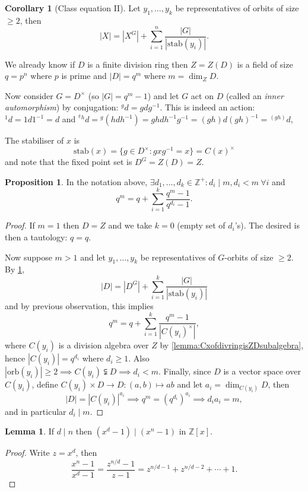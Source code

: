 \documentclass[a4paper]{article}
\newcommand{\Z}{\mathbb{Z}}
\newcommand{\orb}{\text{orb}}
\newcommand{\stab}{\text{stab}}
\theoremstyle{definition}
\newtheorem{prop}[defn]{Proposition}
\newtheorem{lemma}[defn]{Lemma}
\newtheorem{coro}[defn]{Corollary}
\begin{document}
\begin{coro}[Class equation II]
\label{coro:CEII}
Let $y_1,\ldots,y_k$ be representatives of orbits of size $\geq 2$, then
\[
|X|=|X^G|+\sum_{i=1}^n \frac{|G|}{|\stab(y_i)|}.
\]
\end{coro}

We already know if $D$ is a finite division ring then $Z=Z(D)$ is a field of size $q=p^n$ where $p$ is prime and $|D|=q^m$ where $m=\dim_Z D$.

Now consider $G=D^\times$ (so $|G|=q^m-1$) and let $G$ act on $D$ (called an \textit{inner automorphism}) by conjugation: $^g d=gdg^{-1}$. This is indeed an action: $^1 d=1d1^{-1}=d$ and ${}^{^g}{}^hd={}^g(hdh^{-1})=ghdh^{-1}g^{-1}=(gh)d(gh)^{-1}={}^{(gh)}d$,

The stabiliser of $x$ is
\[
\stab(x)=\{g\in D^\times:gxg^{-1}=x\}=C(x)^\times
\]
and note that the fixed point set is $D^G=Z(D)=Z$.

\begin{prop}
\label{prop:qmisqplussum}
In the notation above, $\exists d_1,\ldots,d_k\in\Z^+:d_i\mid m,d_i<m \ \forall i$ and
\[
q^m=q+\sum_{i=1}^k\frac{q^m-1}{q^{d_i}-1}.
\]
\end{prop}
\begin{proof}
If $m=1$ then $D=Z$ and we take $k=0$ (empty set of $d_i$'s). The desired is then a tautology: $q=q$.

Now suppose $m>1$ and let $y_1,\ldots,y_k$ be representatives of $G$-orbits of size $\geq 2$. By \ref{coro:CEII},
\[
|D|=|D^G|+\sum_{i=1}^k\frac{|G|}{|\stab(y_i)|}
\]
and by previous observation, this implies
\[
q^m=q+\sum_{i=1}^k\frac{q^m-1}{|C(y_i)^\times|},
\]
where $C(y_i)$ is a division algebra over $Z$ by \ref{lemma:CxofdivringisZDsubalgebra}, hence $|C(y_i)|=q^{d_i}$ where $d_i\geq 1$. Also $|\orb(y_i)|\geq 2\implies C(y_i)\subsetneqq D\implies d_i<m$. Finally, since $D$ is a vector space over $C(y_i)$, define $C(y_i)\times D\rightarrow D:(a,b)\mapsto ab$ and let $a_i=\dim_{C(y_i)}D$, then
\[
|D|=|C(y_i)|^{a_i}\implies q^m=(q^{d_i})^{a_i}\implies d_ia_i=m,
\]
and in particular $d_i\mid m$.
\end{proof}

\begin{lemma}
If $d\mid n$ then $(x^d-1)\mid(x^n-1)$ in $\Z[x]$.
\end{lemma}
\begin{proof}
Write $z=x^d$, then
\[
\frac{x^n-1}{x^d-1}=\frac{z^{n/d}-1}{z-1}=z^{n/d-1}+z^{n/d-2}+\cdots+1.
\]
\end{proof}
\end{document}
